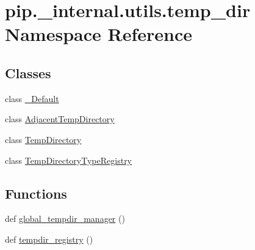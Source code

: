 \hypertarget{namespacepip_1_1__internal_1_1utils_1_1temp__dir}{}\section{pip.\+\_\+internal.\+utils.\+temp\+\_\+dir Namespace Reference}
\label{namespacepip_1_1__internal_1_1utils_1_1temp__dir}
\subsection*{Classes}
\begin{DoxyCompactItemize}
\item 
class \hyperlink{classpip_1_1__internal_1_1utils_1_1temp__dir_1_1__Default}{\+\_\+\+Default}
\item 
class \hyperlink{classpip_1_1__internal_1_1utils_1_1temp__dir_1_1AdjacentTempDirectory}{Adjacent\+Temp\+Directory}
\item 
class \hyperlink{classpip_1_1__internal_1_1utils_1_1temp__dir_1_1TempDirectory}{Temp\+Directory}
\item 
class \hyperlink{classpip_1_1__internal_1_1utils_1_1temp__dir_1_1TempDirectoryTypeRegistry}{Temp\+Directory\+Type\+Registry}
\end{DoxyCompactItemize}
\subsection*{Functions}
\begin{DoxyCompactItemize}
\item 
def \hyperlink{namespacepip_1_1__internal_1_1utils_1_1temp__dir_a23b75e869bce0195b7ae8bade9d56a6c}{global\+\_\+tempdir\+\_\+manager} ()
\item 
def \hyperlink{namespacepip_1_1__internal_1_1utils_1_1temp__dir_a0f445dd9475f4d2ce34fb43088f413e2}{tempdir\+\_\+registry} ()
\end{DoxyCompactItemize}
